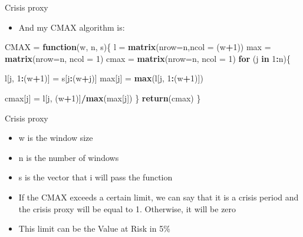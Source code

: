 \documentclass[
  10pt,
  ignorenonframetext,
]{beamer}
\newenvironment{Shaded}{\begin{snugshade}}{\end{snugshade}}
\newcommand{\ControlFlowTok}[1]{\textcolor[rgb]{0.13,0.29,0.53}{\textbf{#1}}}
\newcommand{\DataTypeTok}[1]{\textcolor[rgb]{0.13,0.29,0.53}{#1}}
\newcommand{\DecValTok}[1]{\textcolor[rgb]{0.00,0.00,0.81}{#1}}
\newcommand{\KeywordTok}[1]{\textcolor[rgb]{0.13,0.29,0.53}{\textbf{#1}}}
\newcommand{\NormalTok}[1]{#1}
\newcommand{\OperatorTok}[1]{\textcolor[rgb]{0.81,0.36,0.00}{\textbf{#1}}}
\newcommand{\StringTok}[1]{\textcolor[rgb]{0.31,0.60,0.02}{#1}}
\providecommand{\tightlist}{%
  \setlength{\itemsep}{0pt}\setlength{\parskip}{0pt}}
\begin{document}
\begin{frame}[fragile]{Crisis proxy}
\protect\hypertarget{crisis-proxy-1}{}

\begin{itemize}
\tightlist
\item
  And my CMAX algorithm is:
\end{itemize}

\begin{Shaded}
\begin{Highlighting}[]
\NormalTok{CMAX =}\StringTok{ }\ControlFlowTok{function}\NormalTok{(w, n, s)\{}
\NormalTok{  l =}\StringTok{ }\KeywordTok{matrix}\NormalTok{(}\DataTypeTok{nrow=}\NormalTok{n,}\DataTypeTok{ncol =}\NormalTok{ (w}\OperatorTok{+}\DecValTok{1}\NormalTok{))}
\NormalTok{  max =}\StringTok{ }\KeywordTok{matrix}\NormalTok{(}\DataTypeTok{nrow=}\NormalTok{n, }\DataTypeTok{ncol =} \DecValTok{1}\NormalTok{)}
\NormalTok{  cmax =}\StringTok{ }\KeywordTok{matrix}\NormalTok{(}\DataTypeTok{nrow=}\NormalTok{n, }\DataTypeTok{ncol =} \DecValTok{1}\NormalTok{)}
  \ControlFlowTok{for}\NormalTok{ (j }\ControlFlowTok{in} \DecValTok{1}\OperatorTok{:}\NormalTok{n)\{}
    
\NormalTok{    l[j, }\DecValTok{1}\OperatorTok{:}\NormalTok{(w}\OperatorTok{+}\DecValTok{1}\NormalTok{)] =}\StringTok{ }\NormalTok{s[j}\OperatorTok{:}\NormalTok{(w}\OperatorTok{+}\NormalTok{j)]}
\NormalTok{    max[j] =}\StringTok{ }\KeywordTok{max}\NormalTok{(l[j, }\DecValTok{1}\OperatorTok{:}\NormalTok{(w}\OperatorTok{+}\DecValTok{1}\NormalTok{)])}
    
\NormalTok{    cmax[j] =}\StringTok{ }\NormalTok{l[j, (w}\OperatorTok{+}\DecValTok{1}\NormalTok{)]}\OperatorTok{/}\KeywordTok{max}\NormalTok{(max[j])}
\NormalTok{  \}}
  \KeywordTok{return}\NormalTok{(cmax)}
\NormalTok{\}}
\end{Highlighting}
\end{Shaded}

\end{frame}

\begin{frame}{Crisis proxy}
\protect\hypertarget{crisis-proxy-2}{}

\begin{itemize}
\tightlist
\item
  w is the window size
\item
  n is the number of windows
\item
  s is the vector that i will pass the function
\item
  If the CMAX exceeds a certain limit, we can say that it is a crisis
  period and the crisis proxy will be equal to 1. Otherwise, it will be
  zero
\item
  This limit can be the Value at Risk in 5\%
\end{itemize}

\end{frame}
\end{document}
